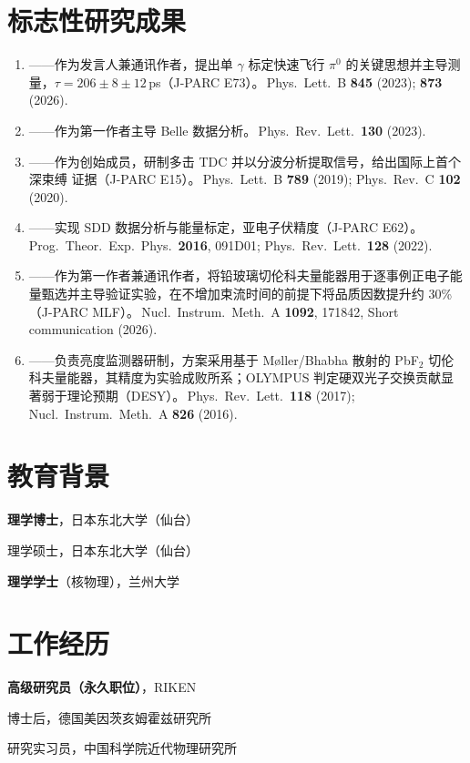 \documentclass[a4paper,11pt,fontset=none]{ctexart}
\newcommand{\cvrow}[2]{%
  \noindent\makebox[2.7cm][l]{\textcolor{impblue}{\small\bfseries #1}}%
  \parbox[t]{\dimexpr\linewidth-2.8cm\relax}{#2}\par\vspace{3pt}}
\begin{document}
\section{标志性研究成果}
\begin{enumerate}
  \item {}——作为发言人兼通讯作者，提出单 $\gamma$ 标定快速飞行 $\pi^0$ 的关键思想并主导测量，$\tau=206\pm8\pm12$\,ps（J-PARC E73）。\,{\small Phys.\ Lett.\ B \textbf{845} (2023); \textbf{873} (2026).}
  \item {}——作为第一作者主导 Belle 数据分析。\,{\small Phys.\ Rev.\ Lett.\ \textbf{130} (2023).}
  \item {}——作为创始成员，研制多击 TDC 并以分波分析提取信号，给出国际上首个深束缚 \Kmpp 证据（J-PARC E15）。\,{\small Phys.\ Lett.\ B \textbf{789} (2019); Phys.\ Rev.\ C \textbf{102} (2020).}
  \item {}——实现 SDD 数据分析与能量标定，亚电子伏精度（J-PARC E62）。\,{\small Prog.\ Theor.\ Exp.\ Phys.\ \textbf{2016}, 091D01; Phys.\ Rev.\ Lett.\ \textbf{128} (2022).}
  \item {}——作为第一作者兼通讯作者，将铅玻璃切伦科夫量能器用于逐事例正电子能量甄选并主导验证实验，在不增加束流时间的前提下将品质因数提升约 30\%（J-PARC MLF）。\,{\small Nucl.\ Instrum.\ Meth.\ A \textbf{1092}, 171842, Short communication (2026).}
  \item {}——负责亮度监测器研制，方案采用基于 M{\o}ller/Bhabha 散射的 PbF$_2$ 切伦科夫量能器，其精度为实验成败所系；OLYMPUS 判定硬双光子交换贡献显著弱于理论预期（DESY）。\,{\small Phys.\ Rev.\ Lett.\ \textbf{118} (2017); Nucl.\ Instrum.\ Meth.\ A \textbf{826} (2016).}
\end{enumerate}


\begin{minipage}[t]{0.49\linewidth}
\section{教育背景}
\cvrow{2006--2009}{\textbf{理学博士}，日本东北大学（仙台）}
\cvrow{2004--2006}{理学硕士，日本东北大学（仙台）}
\cvrow{1998--2002}{\textbf{理学学士}（核物理），兰州大学}
\end{minipage}\hfill
\begin{minipage}[t]{0.49\linewidth}
\section{工作经历}
\cvrow{2012--至今}{\textbf{高级研究员（永久职位）}，RIKEN}
\cvrow{2009--2012}{博士后，德国美因茨亥姆霍兹研究所}
\cvrow{2002--2004}{研究实习员，中国科学院近代物理研究所}
\end{minipage}
\end{document}
